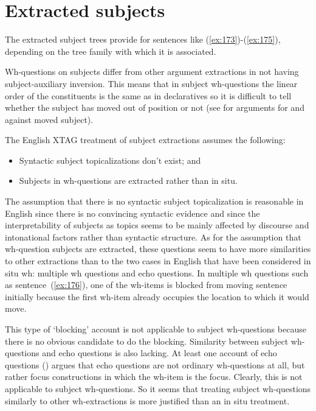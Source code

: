  
 
\section{Extracted subjects} 
\label{subject-extraction} 
 
The extracted subject trees provide for sentences like (\ref{ex:173})-(\ref{ex:175}), 
depending on the tree family with which it is associated. 
 
\beginsentences
{}\label{ex:173} 
\label{ex:174} 
\label{ex:175} 
\endsentences

 
Wh-questions on subjects differ from other argument extractions in 
not having subject-auxiliary inversion.  This means that in subject 
wh-questions the linear order of the constituents is the same as in 
declaratives so it is difficult to tell whether the subject has moved 
out of position or not (see \cite{heycock/kroch93gagl} for arguments 
for and against moved subject). 
 
The English XTAG treatment of subject extractions assumes the 
following: 
 
\begin{itemize} 
\item Syntactic subject topicalizations don't exist; and 
\item Subjects in wh-questions are extracted rather than in situ. 
\end{itemize} 
 
The assumption that there is no syntactic subject topicalization is reasonable 
in English since there is no convincing syntactic evidence and since the 
interpretability of subjects as topics seems to be mainly affected by discourse 
and intonational factors rather than syntactic structure. As for the assumption 
that wh-question subjects are extracted, these questions seem to have more 
similarities to other extractions than to the two cases in English that have 
been considered in situ wh: multiple wh questions and echo questions. In 
multiple wh questions such as sentence~(\ref{ex:176}), one of the wh-items is blocked 
from moving sentence initially because the first wh-item already occupies the 
location to which it would move. 
 
\beginsentences
{}\label{ex:176} 
\endsentences

 
This type of `blocking' account is not applicable to 
subject wh-questions because there is no obvious candidate to do the 
blocking.  Similarity between subject wh-questions and echo questions 
is also lacking.  At least one account of echo questions 
(\cite{hockey94}) argues that echo questions are not ordinary 
wh-questions at all, but rather focus constructions in which the 
wh-item is the focus. Clearly, this is not applicable to subject 
wh-questions. So it seems that treating subject wh-questions similarly 
to other wh-extractions is more justified than an in situ treatment. 
 
